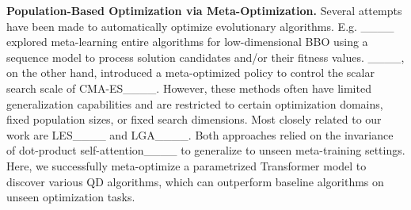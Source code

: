 \textbf{Population-Based Optimization via Meta-Optimization.}
Several attempts have been made to automatically optimize evolutionary algorithms. E.g. ____ explored meta-learning entire algorithms for low-dimensional BBO using a sequence model to process solution candidates and/or their fitness values. ____, on the other hand, introduced a meta-optimized policy to control the scalar search scale of CMA-ES____. However, these methods often have limited generalization capabilities and are restricted to certain optimization domains, fixed population sizes, or fixed search dimensions.
Most closely related to our work are LES____ and LGA____. Both approaches relied on the invariance of dot-product self-attention____ to generalize to unseen meta-training settings.
Here, we successfully meta-optimize a parametrized Transformer model to discover various QD algorithms, which can outperform baseline algorithms on unseen optimization tasks. 
